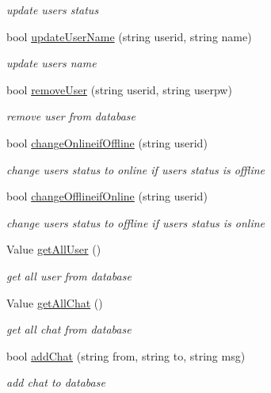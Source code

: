 \begin{DoxyCompactItemize}
\begin{DoxyCompactList}\small\item\em update user\textquotesingle{}s status \end{DoxyCompactList}\item 
bool \mbox{\hyperlink{class_d_b_manager_a5778a4df0fe537979dc09a1265a4abee}{update\+User\+Name}} (string userid, string name)
\begin{DoxyCompactList}\small\item\em update user\textquotesingle{}s name \end{DoxyCompactList}\item 
bool \mbox{\hyperlink{class_d_b_manager_a0af0724f0b21b7e33062b93bd700ded6}{remove\+User}} (string userid, string userpw)
\begin{DoxyCompactList}\small\item\em remove user from database \end{DoxyCompactList}\item 
bool \mbox{\hyperlink{class_d_b_manager_a51bb4bba0e60fecca52f93c93063fa90}{change\+Onlineif\+Offline}} (string userid)
\begin{DoxyCompactList}\small\item\em change user\textquotesingle{}s status to online if user\textquotesingle{}s status is offline \end{DoxyCompactList}\item 
bool \mbox{\hyperlink{class_d_b_manager_a7e404783a429de457f15b354bc40eb57}{change\+Offlineif\+Online}} (string userid)
\begin{DoxyCompactList}\small\item\em change user\textquotesingle{}s status to offline if user\textquotesingle{}s status is online \end{DoxyCompactList}\item 
Value \mbox{\hyperlink{class_d_b_manager_a0171d3489ef375c9eeff4014a4a485de}{get\+All\+User}} ()
\begin{DoxyCompactList}\small\item\em get all user from database \end{DoxyCompactList}\item 
Value \mbox{\hyperlink{class_d_b_manager_a546cf5b82fe9cb115cfee8d52f90f0da}{get\+All\+Chat}} ()
\begin{DoxyCompactList}\small\item\em get all chat from database \end{DoxyCompactList}\item 
bool \mbox{\hyperlink{class_d_b_manager_a3631eb2172602412ceeb8f9608406aec}{add\+Chat}} (string from, string to, string msg)
\begin{DoxyCompactList}\small\item\em add chat to database \end{DoxyCompactList}\end{DoxyCompactItemize}


